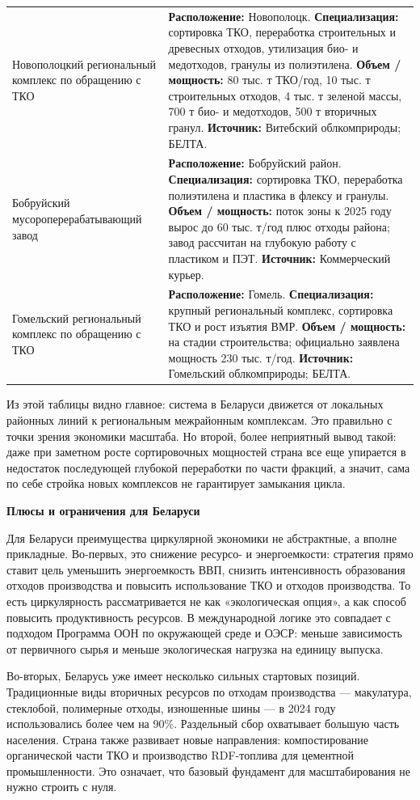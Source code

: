 \documentclass[14pt,a4paper]{extarticle}
\begin{document}
\begin{longtable}{>{\raggedright\arraybackslash}p{5.55cm}>{\raggedright\arraybackslash}p{10.0cm}}
Новополоцкий региональный комплекс по обращению с ТКО & \textbf{Расположение:} Новополоцк. \textbf{Специализация:} сортировка ТКО, переработка строительных и древесных отходов, утилизация био- и медотходов, гранулы из полиэтилена. \textbf{Объем / мощность:} 80 тыс. т ТКО/год, 10 тыс. т строительных отходов, 4 тыс. т зеленой массы, 700 т био- и медотходов, 500 т вторичных гранул. \textbf{Источник:} Витебский облкомприроды; БЕЛТА. \\
Бобруйский мусороперерабатывающий завод & \textbf{Расположение:} Бобруйский район. \textbf{Специализация:} сортировка ТКО, переработка полиэтилена и пластика в флексу и гранулы. \textbf{Объем / мощность:} поток зоны к 2025 году вырос до 60 тыс. т/год плюс отходы района; завод рассчитан на глубокую работу с пластиком и ПЭТ. \textbf{Источник:} Коммерческий курьер. \\
Гомельский региональный комплекс по обращению с ТКО & \textbf{Расположение:} Гомель. \textbf{Специализация:} крупный региональный комплекс, сортировка ТКО и рост изъятия ВМР. \textbf{Объем / мощность:} на стадии строительства; официально заявлена мощность 230 тыс. т/год. \textbf{Источник:} Гомельский облкомприроды; БЕЛТА. \\
\bottomrule
\end{longtable}

Из этой таблицы видно главное: система в Беларуси движется от локальных районных линий к региональным межрайонным комплексам. Это правильно с точки зрения экономики масштаба. Но второй, более неприятный вывод такой: даже при заметном росте сортировочных мощностей страна все еще упирается в недостаток последующей глубокой переработки по части фракций, а значит, сама по себе стройка новых комплексов не гарантирует замыкания цикла.

\textbf{Плюсы и ограничения для Беларуси}

Для Беларуси преимущества циркулярной экономики не абстрактные, а вполне прикладные. Во-первых, это снижение ресурсо- и энергоемкости: стратегия прямо ставит цель уменьшить энергоемкость ВВП, снизить интенсивность образования отходов производства и повысить использование ТКО и отходов производства. То есть циркулярность рассматривается не как «экологическая опция», а как способ повысить продуктивность ресурсов. В международной логике это совпадает с подходом Программа ООН по окружающей среде и ОЭСР: меньше зависимость от первичного сырья и меньше экологическая нагрузка на единицу выпуска.

Во-вторых, Беларусь уже имеет несколько сильных стартовых позиций. Традиционные виды вторичных ресурсов по отходам производства --- макулатура, стеклобой, полимерные отходы, изношенные шины --- в 2024 году использовались более чем на 90\%. Раздельный сбор охватывает большую часть населения. Страна также развивает новые направления: компостирование органической части ТКО и производство RDF-топлива для цементной промышленности. Это означает, что базовый фундамент для масштабирования не нужно строить с нуля.
\end{document}
